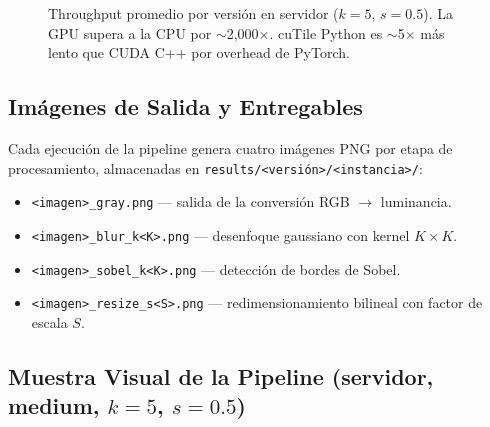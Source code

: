 \documentclass[12pt,a4paper]{article}
\begin{document}
\begin{figure}[H]
\centering
{}
\caption{Throughput promedio por versi\'on en servidor ($k=5$, $s=0.5$). La GPU supera a la CPU por $\sim$2,000$\times$. cuTile Python es $\sim$5$\times$ m\'as lento que CUDA C++ por overhead de PyTorch.}
\label{fig:throughput}
\end{figure}

\subsection{Im\'agenes de Salida y Entregables}

Cada ejecuci\'on de la pipeline genera cuatro im\'agenes PNG por etapa de procesamiento, almacenadas en \texttt{results/<versi\'on>/<instancia>/}:

\begin{itemize}
  \item \texttt{<imagen>\_gray.png} --- salida de la conversi\'on RGB $\rightarrow$ luminancia.
  \item \texttt{<imagen>\_blur\_k<K>.png} --- desenfoque gaussiano con kernel $K \times K$.
  \item \texttt{<imagen>\_sobel\_k<K>.png} --- detecci\'on de bordes de Sobel.
  \item \texttt{<imagen>\_resize\_s<S>.png} --- redimensionamiento bilineal con factor de escala $S$.
\end{itemize}

\subsection{Muestra Visual de la Pipeline (servidor, medium, $k=5$, $s=0.5$)}
\end{document}
